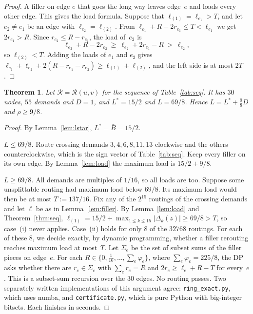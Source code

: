 \documentclass[11pt]{article}
\theoremstyle{plain}
\newtheorem{theorem}{Theorem}
\theoremstyle{definition}
\theoremstyle{remark}
\begin{document}
\begin{proof}
A filler on edge $e$ that goes the long way leaves edge~$e$ and loads every other edge. This gives the load formula.
Suppose that $\ell_{(1)}=\ell_{e_1}>T$, and let $e_2\neq e_1$ be an edge with $\ell_{e_2}=\ell_{(2)}$.
From $\ell_{e_1}+R-2r_{e_1}\le T<\ell_{e_1}$ we get $2r_{e_1}>R$. Since $r_{e_2}\le R-r_{e_1}$, the load of~$e_2$ is
\[
\ell_{e_2}+R-2r_{e_2}\ \ge\ \ell_{e_2}+2r_{e_1}-R\ >\ \ell_{e_2},
\]
so $\ell_{(2)}<T$.
Adding the loads of $e_1$ and $e_2$ gives $\ell_{e_1}+\ell_{e_2}+2(R-r_{e_1}-r_{e_2})\ge\ell_{(1)}+\ell_{(2)}$, and the left side is at most $2T$.
\end{proof}

\begin{theorem}\label{thm:ring}
Let $\mathcal{R}=\mathcal{R}(u,v)$ for the sequence of Table~\ref{tab:seq}. It has $30$ nodes, $55$ demands and $D=1$, and $L^*=15/2$ and $L=69/8$. Hence $L=L^*+\tfrac98D$ and $\rho\ge 9/8$.
\end{theorem}

\begin{proof}
By Lemma~\ref{lem:lstar}, $L^*=\bar B=15/2$.

\emph{$L\le 69/8$.} Route crossing demands $3,4,6,8,11,13$ clockwise and the others counterclockwise, which is the sign vector of Table~\ref{tab:seq}. Keep every filler on its own edge. By Lemma~\ref{lem:load} the maximum load is $15/2+9/8$.

\emph{$L\ge 69/8$.} All demands are multiples of $1/16$, so all loads are too. Suppose some unsplittable routing had maximum load below $69/8$. Its maximum load would then be at most $T:=137/16$.
Fix any of the $2^{15}$ routings of the crossing demands and let $\ell$ be as in Lemma~\ref{lem:filler}.
By Lemma~\ref{lem:load} and Theorem~\ref{thm:seq}, $\ell_{(1)}=15/2+\max_{1\le k\le 15}|\Delta_k(z)|\ge 69/8>T$, so case~(i) never applies.
Case~(ii) holds for only $8$ of the $32768$ routings.
For each of these 8, we decide exactly, by dynamic programming, whether a filler rerouting reaches maximum load at most~$T$.
Let $\Sigma_e$ be the set of subset sums of the filler pieces on edge~$e$. For each $R\in\{0,\tfrac1{16},\dots,\sum_e\varphi_e\}$, where $\sum_e\varphi_e=225/8$, the DP asks whether there are $r_e\in\Sigma_e$ with $\sum_er_e=R$ and $2r_e\ge\ell_e+R-T$ for every~$e$. This is a subset-sum recursion over the 30 edges.
No routing passes. Two separately written implementations of this argument agree: \texttt{ring\_exact.py}, which uses numba, and \texttt{certificate.py}, which is pure Python with big-integer bitsets. Each finishes in seconds.
\end{proof}
\end{document}
